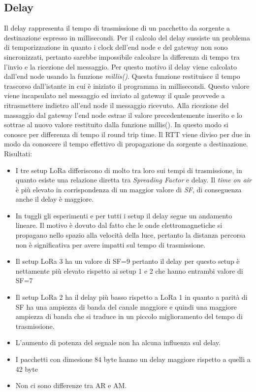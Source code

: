 \documentclass[12pt,a4paper,openright,twoside]{report}
\begin{document}
\subsection{Delay}
Il delay rappresenta il tempo di trasmissione di un pacchetto da sorgente a destinazione espresso in millisecondi. Per il calcolo del delay sussiste un problema di temporizzazione in quanto i clock dell'end node e del gateway non sono sincronizzati, pertanto sarebbe impossibile calcolare la differenza di tempo tra l'invio e la ricezione del messaggio. Per questo motivo il delay viene calcolato dall'end node usando la funzione \textit{millis()}. Questa funzione restituisce il tempo trascorso dall'istante in cui \`e iniziato il programma in millisecondi. Questo valore viene incapsulato nel messaggio ed inviato al gateway il quale provvede a ritrasmettere indietro all'end node il messaggio ricevuto. Alla ricezione del massaggio dal gateway l'end node estrae il valore precedentemente inserito e lo sottrae al nuovo valore restituito dalla funzione millis(). In questo modo si conosce per differenza di tempo il round trip time. Il RTT viene diviso per due in modo da conoscere il tempo effettivo di propagazione da sorgente a destinazione.
Risultati:
\begin{itemize}    
\item I tre setup LoRa differiscono di molto tra loro sui tempi di trasmissione, in quanto esiste una relazione diretta tra \textit{Spreading Factor} e delay. 
Il \textit{time on air} \`e pi\`u elevato in corrispondenza di un maggior valore di \textit{SF}, di conseguenza anche il delay \`e maggiore. 
\item In tuggli gli esperimenti e per tutti i setup il delay segue un andamento lineare. Il motivo \`e dovuto dal fatto che le onde elettromagnetiche si propagano nello spazio alla velocit\`a della luce, pertanto la distanza percorsa non \`e significativa per avere impatti sul tempo di trasmissione.
\item Il setup LoRa 3 ha un valore di SF=9 pertanto il delay per questo setup \`e nettamente pi\`u elevato rispetto ai setup 1 e 2 che hanno entrambi valore di SF=7
\item Il setup LoRa 2 ha il delay pi\`u basso rispetto a LoRa 1 in quanto a parit\`a di SF ha una ampiezza di banda del canale maggiore e quindi una maggiore ampiezza di banda che si traduce in un piccolo miglioramento del tempo di trasmissione.
\item L'aumento di potenza del segnale non ha alcuna influenza sul delay.
\item I pacchetti con dimesione 84 byte hanno un delay maggiore rispetto a quelli a 42 byte
\item Non ci sono differenze tra AR e AM.
\end{itemize}
\end{document}
